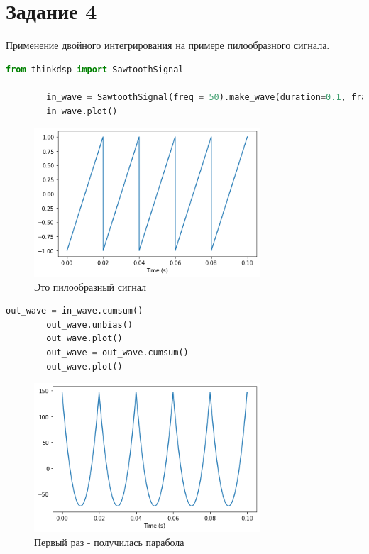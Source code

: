 \documentclass[a4paper, 12pt]{report}
\begin{document}
	\section{Задание 4}
	Применение двойного интегрирования на примере пилообразного сигнала.
	\begin{lstlisting}[language=Python,caption=Пилообразный сигнал]
		from thinkdsp import SawtoothSignal

		in_wave = SawtoothSignal(freq = 50).make_wave(duration=0.1, framerate=44100)
		in_wave.plot()
	\end{lstlisting}
	\begin{figure}[H]
		\centering
		\includegraphics[width=0.75\textwidth]{task7.png}
		\caption{Это пилообразный сигнал}
		\label{fig:task7}
	\end{figure}
	\begin{lstlisting}[language=Python,caption=Два раза применили фильтр для суммирования]
		out_wave = in_wave.cumsum()
		out_wave.unbias()
		out_wave.plot()
		out_wave = out_wave.cumsum()
		out_wave.plot()
	\end{lstlisting}
	\begin{figure}[H]
		\centering
		\includegraphics[width=0.75\textwidth]{task8.png}
		\caption{Первый раз - получилась парабола}
		\label{fig:task8}
	\end{figure}
\end{document}
